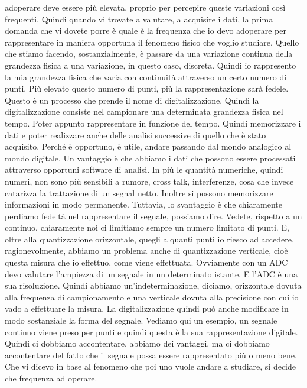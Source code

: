 {adoperare deve essere più elevata, proprio per percepire queste variazioni così frequenti. Quindi quando vi trovate a valutare, a acquisire i dati, la prima domanda che vi dovete porre è quale è la frequenza che io devo adoperare per rappresentare in maniera opportuna il fenomeno fisico che voglio studiare. Quello che stiamo facendo, sostanzialmente, è passare da una variazione continua della grandezza fisica a una variazione, in questo caso, discreta. Quindi io rappresento la mia grandezza fisica che varia con continuità attraverso un certo numero di punti. Più elevato questo numero di punti, più la rappresentazione sarà fedele. Questo è un processo che prende il nome di digitalizzazione. Quindi la digitalizzazione consiste nel campionare una determinata grandezza fisica nel tempo. Poter appunto rappresentare in funzione del tempo. Quindi memorizzare i dati e poter realizzare anche delle analisi successive di quello che è stato acquisito. Perché è opportuno, è utile, andare passando dal mondo analogico al mondo digitale. Un vantaggio è che abbiamo i dati che possono essere processati attraverso opportuni software di analisi. In più le quantità numeriche, quindi numeri, non sono più sensibili a rumore, cross talk, interferenze, cosa che invece catarizza la trattazione di un segnal netto. Inoltre si possono memorizzare informazioni in modo permanente. Tuttavia, lo svantaggio è che chiaramente perdiamo fedeltà nel rappresentare il segnale, possiamo dire. Vedete, rispetto a un continuo, chiaramente noi ci limitiamo sempre un numero limitato di punti. E, oltre alla quantizzazione orizzontale, quegli a quanti punti io riesco ad accedere, ragionevolmente, abbiamo un problema anche di quantizzazione verticale, cioè questa misura che io effettuo, come viene effettuata. Ovviamente con un ADC devo valutare l'ampiezza di un segnale in un determinato istante. E l'ADC è una sua risoluzione. Quindi abbiamo un'indeterminazione, diciamo, orizzontale dovuta alla frequenza di campionamento e una verticale dovuta alla precisione con cui io vado a effettuare la misura. La digitalizzazione quindi può anche modificare in modo sostanziale la forma del segnale. Vediamo qui un esempio, un segnale continuo viene preso per punti e quindi questa è la sua rappresentazione digitale. Quindi ci dobbiamo accontentare, abbiamo dei vantaggi, ma ci dobbiamo accontentare del fatto che il segnale possa essere rappresentato più o meno bene. Che vi dicevo in base al fenomeno che poi uno vuole andare a studiare, si decide che frequenza ad operare. 

}

